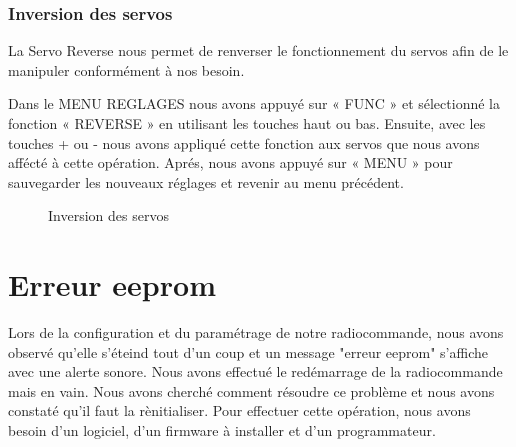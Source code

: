 	
	
	
	\subsubsection{Inversion des servos}
	La Servo Reverse nous permet de renverser le fonctionnement du servos afin de le manipuler conformément à nos besoin.
	
	
	
	Dans le MENU REGLAGES nous avons appuyé sur « FUNC » et sélectionné la fonction « REVERSE » en utilisant les touches haut ou bas. Ensuite, avec les touches + ou -
	nous avons appliqué cette fonction aux servos que nous avons affécté à cette opération. Aprés, nous avons appuyé sur « MENU » pour sauvegarder les nouveaux réglages et revenir au menu précédent.
	\begin{figure}[H]
		\begin{center}
			\centering
		\end{center}
		\caption{Inversion des servos}
	\end{figure}
	\section{Erreur eeprom}
	Lors de la configuration et du paramétrage de notre radiocommande, nous avons observé qu'elle s'éteind tout d'un coup et un message "erreur eeprom" s'affiche avec une alerte sonore. Nous avons effectué le redémarrage de la radiocommande mais en vain. Nous avons cherché comment résoudre ce problème et nous avons constaté qu'il faut la rènitialiser. Pour effectuer cette opération, nous avons besoin d'un logiciel, d'un firmware à installer et d'un programmateur.
